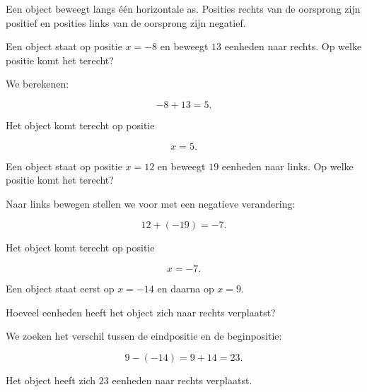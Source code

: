 \documentclass{ximera}
\begin{document}
\begin{oefening}{\oefU}

Een object beweegt langs één horizontale as. Posities rechts van de oorsprong
zijn positief en posities links van de oorsprong zijn negatief.

\begin{question}

Een object staat op positie \(x=-8\) en beweegt \(13\) eenheden naar rechts.
Op welke positie komt het terecht?

\begin{oplossing}

We berekenen:

\[
-8+13=5.
\]

Het object komt terecht op positie

\[
x=5.
\]

\end{oplossing}

\end{question}


\begin{question}

Een object staat op positie \(x=12\) en beweegt \(19\) eenheden naar links.
Op welke positie komt het terecht?

\begin{oplossing}

Naar links bewegen stellen we voor met een negatieve verandering:

\[
12+(-19)=-7.
\]

Het object komt terecht op positie

\[
x=-7.
\]

\end{oplossing}

\end{question}


\begin{question}

Een object staat eerst op \(x=-14\) en daarna op \(x=9\).

Hoeveel eenheden heeft het object zich naar rechts verplaatst?

\begin{oplossing}

We zoeken het verschil tussen de eindpositie en de beginpositie:

\[
9-(-14)
=
9+14
=
23.
\]

Het object heeft zich \(23\) eenheden naar rechts verplaatst.


\end{oplossing}
\end{question}
\end{oefening}
\end{document}

